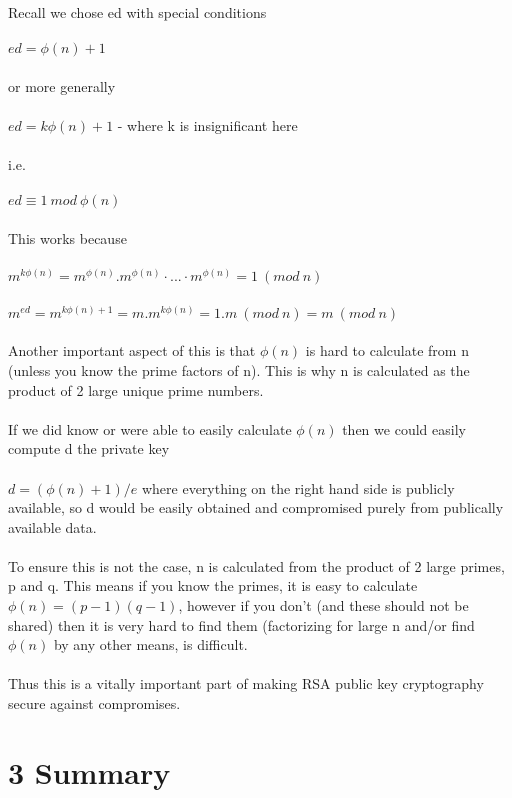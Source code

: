 \documentclass[11pt]{article}   	%
\begin{document}
Recall we chose ed with special conditions \\
\\
$ ed = \phi(n) + 1 $ \\
\\
or more generally \\
\\
$ ed = k\phi(n) + 1 $ - where k is insignificant here \\
\\
i.e. \\
\\
$ ed \equiv 1 \  mod \ \phi(n) $ \\
\\
This works because \\
\\
$ m^{k \phi(n)} = m^{\phi(n)} . m^{\phi(n)} · . . . · m^{\phi(n)} = 1 \ (mod \ n) $ \\
\\
$ m^{ed} = m^{k\phi(n) + 1} = m . m^{k \phi(n)} = 1.m \ (mod \ n) = m \ (mod \ n) $ \\
\\
Another important aspect of this is that $ \phi(n) $ is hard to calculate from n (unless you know the prime factors of n). This is why n is calculated as the product of 2 large unique prime numbers. \\
\\
If we did know or were able to easily calculate $ \phi(n) $ then we could easily compute d the private key \\
\\
$ d = (\phi(n) + 1) / e $ where everything on the right hand side is publicly available, so d would be easily obtained and compromised purely from publically available data. \\
\\
To ensure this is not the case, n is calculated from the product of 2 large primes, p and q. This means if you know the primes, it is easy to calculate $ \phi(n) = (p-1)(q-1) $, however if you don't (and these should not be shared) then it is very hard to find them (factorizing for large n and/or find $ \phi(n) $ by any other means, is difficult. \\
\\
Thus this is a vitally important part of making RSA public key cryptography secure against compromises.

\break


\section*{3 Summary}
\end{document}

